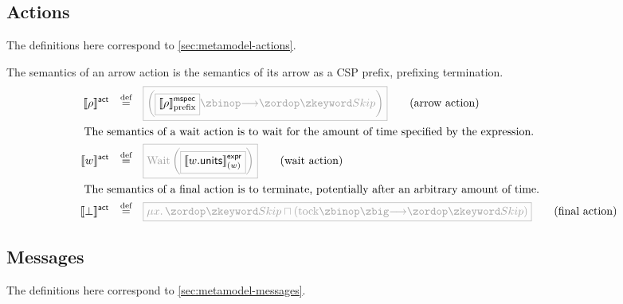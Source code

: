 \subsection{Actions}\label{ssec:semantics-tockcsp-actions}

The definitions here correspond to \cref{sec:metamodel-actions}.

\begin{definition}[\msequenceaction]

\newcommand{\wait}[1]{\text{Wait}\left(#1\right)}
  
The semantics of an arrow action is the semantics of its arrow as a CSP prefix,
prefixing termination.
%
\begin{align*}
  \actsema{\anarrow}
  \quad\defeq\quad
  &
    \tlang{
    \left(
    \olang{\pmspecsema{\anarrow}}
    \then
    \Skip
    \right)
    }
    \tag{arrow action}
  \\
  \intertext{
  The semantics of a wait action is to wait for the amount of time specified by the expression.}
  \actsema{\await}
  \quad\defeq\quad
  &
    \tlang{
    \wait{\olang{\exprsema{\field{\await}{units}}{\await}}}
    }
    \tag{wait action}
  \\
  \intertext{
  The semantics of a final action is to terminate, potentially after an arbitrary amount of time.}
  \actsema{\bot}
  \quad\defeq\quad
  &
    \tlang{
    \mu x \ldotp
    \Skip
    \intchoice
    \left(\tock \circthen \Skip\right)
    }
    \tag{final action}
\end{align*}

\end{definition}

\subsection{Messages}\label{ssec:semantics-tockcsp-messages}

The definitions here correspond to \cref{sec:metamodel-messages}.

